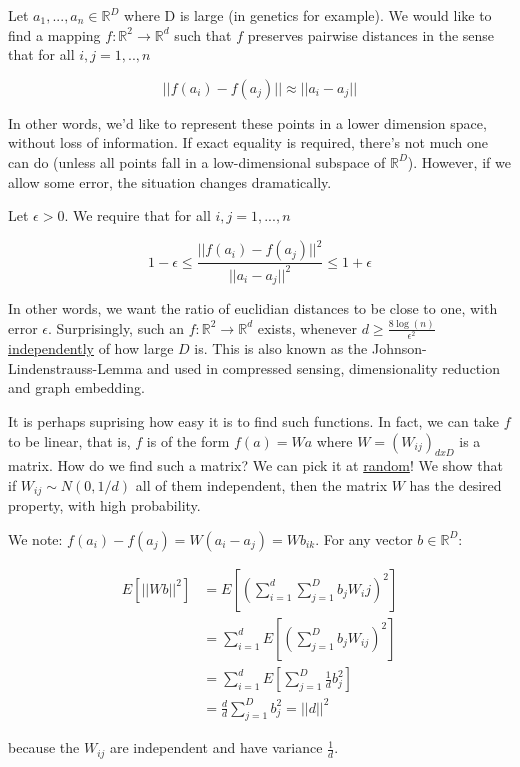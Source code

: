 \documentclass[12pt, authoryear]{elsarticle}
\begin{document}
Let $a_1, ... , a_n \in \mathbb{R}^D$ where D is large (in genetics for example). We would like to find a mapping $f : \mathbb{R}^2 \rightarrow \mathbb{R}^d $ such that $f$ preserves pairwise distances in the sense that for all $i,j = 1,..,n$ 

$$|| f(a_i) - f(a_j)|| \approx || a_i - a_j || $$

In other words, we'd like to represent these points in a lower dimension space, without loss of information.  If exact equality is required, there's not much one can do (unless all points fall in a low-dimensional subspace of $\mathbb{R}^D$). However, if we allow some error, the situation changes dramatically.

Let $\epsilon > 0$. We require that for all $i,j = 1,...,n$ 

$$ 1-\epsilon \leq \frac{||f(a_i) - f(a_j)||^2}{||a_i - a_j||^2} \leq 1 + \epsilon $$ 

In other words, we want the ratio of euclidian distances to be close to one, with error $\epsilon$. Surprisingly, such an $f : \mathbb{R}^2 \rightarrow \mathbb{R}^d $ exists, whenever $d \geq \frac{8\log(n)}{\epsilon^2}$ \underline{independently} of how large $D$ is. This is also known as the Johnson-Lindenstrauss-Lemma and used in compressed sensing, dimensionality reduction and graph embedding. 

It is perhaps suprising how easy it is to find such functions. In fact, we can take $f$ to be linear, that is, $f$ is of the form $f(a) = Wa$ where $W =(W_{ij})_{dxD}$ is a matrix. How do we find such a matrix? We can pick it at \underline{random}! We show that if $W_{ij} \sim N(0, 1/d)$ all of them independent, then the matrix $W$ has the desired property, with high probability. 

We note: $f(a_i) - f(a_j) = W(a_i-a_j) = Wb_{ik}$. For any vector $b \in \mathbb{R}^D$:

\begin{equation*}
\begin{split}
E[||Wb||^2]  &= E[(\sum_{i=1}^d\sum_{j=1}^D b_j W_ij)^2] \\
&= \sum_{i=1}^d E[(\sum_{j=1}^D b_j W_{ij})^2] \\
&= \sum_{i=1}^d E[\sum_{j=1}^D \frac{1}{d}b_j^2] \\
&= \frac{d}{d} \sum_{j=1}^D b_j^2 = ||d||^2
\end{split}
\end{equation*}

because the $W_{ij}$ are independent and have variance $\frac{1}{d}$. 
\end{document}
